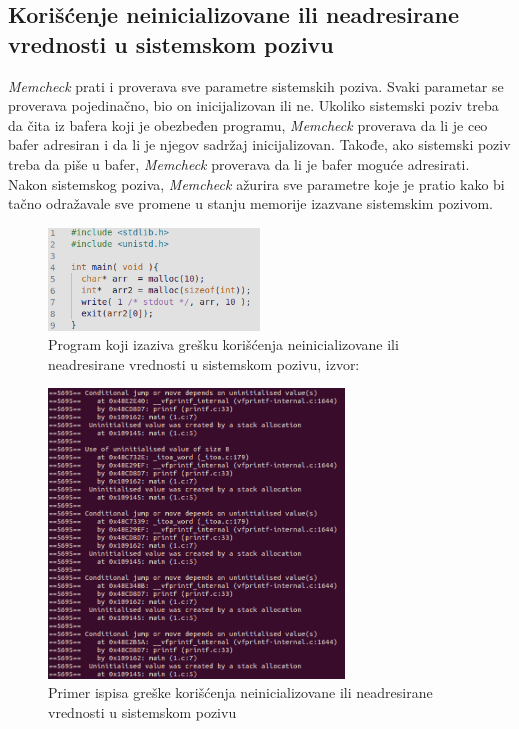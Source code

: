 \documentclass[12pt,oneside]{memoir}
\theoremstyle{plain}
\theoremstyle{definition}
\begin{document}
\subsection{Korišćenje neinicializovane ili neadresirane vrednosti u sistemskom pozivu}

\textit{Memcheck} prati i proverava sve parametre sistemskih poziva. Svaki parametar se proverava pojedinačno, bio on inicijalizovan ili ne. Ukoliko sistemski poziv treba da čita iz bafera  koji je obezbeđen programu, \textit{Memcheck} proverava da li je ceo bafer adresiran i da li je njegov sadržaj inicijalizovan. Takođe, ako sistemski poziv treba da piše u bafer, \textit{Memcheck} proverava da li je bafer moguće adresirati. Nakon sistemskog poziva, \textit{Memcheck} ažurira sve parametre koje je pratio kako bi tačno odražavale sve promene u stanju memorije izazvane sistemskim pozivom.

\begin{figure}[!ht]
  \centering
  \includegraphics[width=0.5\textwidth]{sysCallErrorProgram.png}
  \caption{Program koji izaziva grešku korišćenja neinicializovane ili neadresirane vrednosti u sistemskom pozivu, izvor: \cite{Memcheck}}
  \label{fig:slika2.6}
\end{figure}

\begin{figure}[!ht]
  \centering
  \includegraphics[width=0.7\textwidth]{sysCallError.png}
  \caption{Primer ispisa greške korišćenja neinicializovane ili neadresirane vrednosti u sistemskom pozivu}
  \label{fig:slika2.7}
\end{figure}
\end{document}
